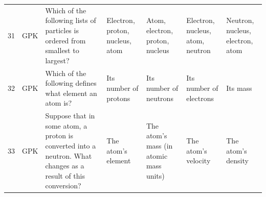 \documentclass[10pt]{article}
\begin{document}
\begin{tiny}
\begin{longtable}{r P{0.3in} P{1.203in} P{0.8in} P{0.8in} P{0.8in} P{0.8in}}
    31    &      GPK &                                                                                                                                                                                                   Which of the following lists of particles is ordered from smallest to largest? &                                                                                                       Electron, proton, nucleus, atom &                                                                       Atom, electron, proton, nucleus &                                                                                           Electron, nucleus, atom, neutron &                                                                                                  Neutron, nucleus, electron, atom \\
    32    &      GPK &                                                                                                                                                                                                                          Which of the following defines what element an atom is? &                                                                                                                 Its number of protons &                                                                                Its number of neutrons &                                                                                                    Its number of electrons &                                                                                                                          Its mass \\
    33    &      GPK &                                                                                                                                                                    Suppose that in some atom, a proton is converted into a neutron. What changes as a result of this conversion? &                                                                                                                    The atom's element &                                                                The atom's mass (in atomic mass units) &                                                                                                        The atom's velocity &                                                                                                                The atom's density \\

\end{longtable}
\end{tiny}
\end{document}
